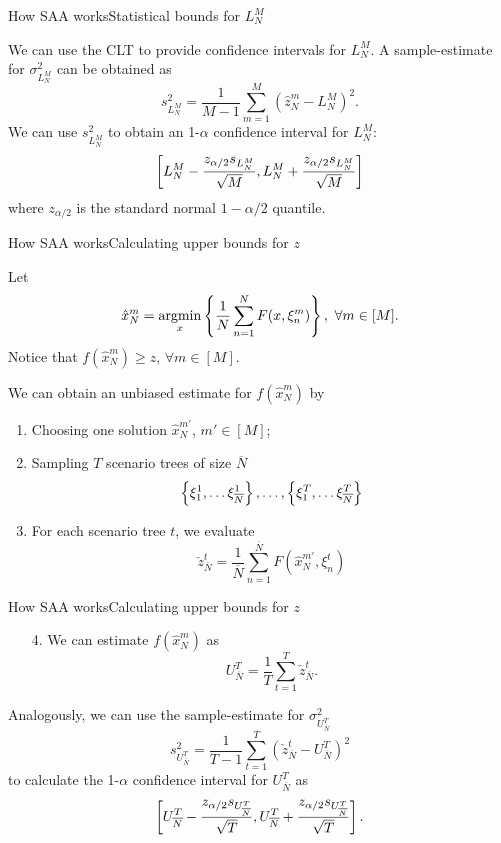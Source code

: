 \begin{frame}{How SAA works}{Statistical bounds for $L_N^M$}

	We can use the CLT to provide \alert{confidence intervals} for $L_N^M$. A sample-estimate for $\sigma^2_{L_N^M}$ can be obtained as 
	$$
		s^2_{L_N^M} = \frac{1}{M-1}	\sum_{m=1}^M (\hat{z}^m_N - L_N^M)^2.
	$$
	\pause
	We can use $s^2_{L_N^M}$ to obtain an  \alert{1-$\alpha$ confidence interval} for $L_N^M$:
	$$
		\left[ L_N^M - \frac{z_{\alpha/2} s_{L_N^M}}{\sqrt{M}}, L_N^M + \frac{z_{\alpha/2} s_{L_N^M}}{\sqrt{M}} \right]
	$$
	where $z_{\alpha/2}$ is the standard normal $1-\alpha/2$ quantile.
	
\end{frame}


\begin{frame}{How SAA works}{Calculating upper bounds for $z$}

	Let 
	$$
		\hat{x}^m_N = \mathop{\rm argmin}_x\left\{ \frac{1}{N}\sum_{n=1}^{N}F(x, \xi_n^m) \right \}, \ \forall m \in [M].
	$$
	Notice that $f(\hat{x}^m_N) \ge z$, $\forall m \in [M]$. 
	
	\pause 
	We can obtain an unbiased estimate for \alert{$f(\hat{x}^m_N)$} by
	\begin{enumerate}
		\item \alert{Choosing} one solution $\hat{x}^{m'}_N$, $m' \in [M]$;
		\item Sampling $T$ scenario trees of size $\overline{N}$
		$$
			\left\{ \xi_1^1, \dots \xi_{\overline{N}}^1 \right \}, \dots, \left\{ \xi_1^T, \dots \xi_{\overline{N}}^T \right \}
		$$
		\item For each scenario tree $t$, we evaluate
		$$
			\check{z}_{\overline{N}}^t = \frac{1}{\overline{N}} \sum_{n=1}^{\overline{N}} F(\hat{x}^{m'}_N, \xi_n^t)
		$$
	\end{enumerate}
	
\end{frame}


\begin{frame}{How SAA works}{Calculating upper bounds for $z$}

	\begin{enumerate}
		\item[4.] We can estimate $f(\hat{x}^m_N)$ as
		\begin{equation*}
			U_{\overline{N}}^T = \frac{1}{T} \sum_{t=1}^T \check{z}_{\overline{N}}^t.
		\end{equation*}
	\end{enumerate}
	
	Analogously, we can use the sample-estimate for $\sigma_{U_{\overline{N}}^T}^2$
	$$
		s^2_{U_{\overline{N}}^T} = \frac{1}{T-1}	\sum_{t=1}^T (\check{z}_{\overline{N}}^t - U_{\overline{N}}^T)^2
	$$
	to calculate the \alert{1-$\alpha$ confidence interval} for $U_{\overline{N}}^T$ as
	$$
		\left[ U_{\overline{N}}^T - \frac{z_{\alpha/2} s_{U_{\overline{N}}^T}}{\sqrt{T}}, U_{\overline{N}}^T + \frac{z_{\alpha/2} s_{U_{\overline{N}}^T}}{\sqrt{T}} \right].
	$$
	
\end{frame}



